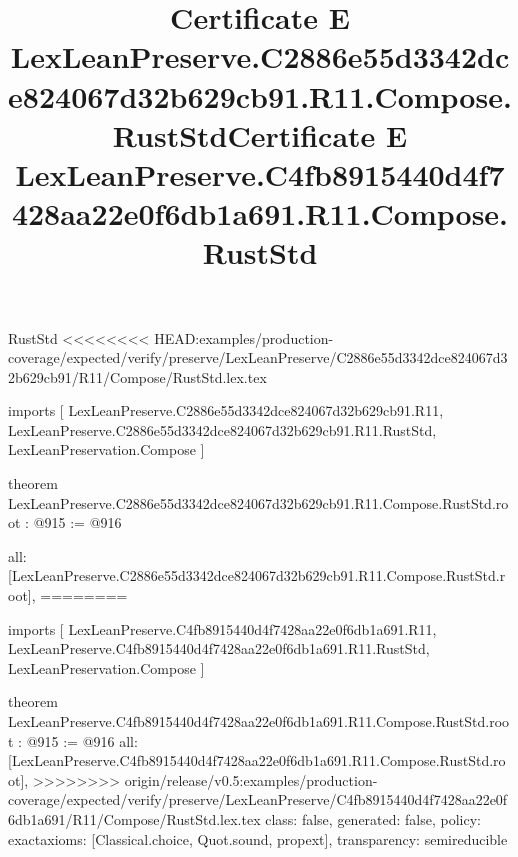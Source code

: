 \begin{lexlean}{RustStd}
<<<<<<<< HEAD:examples/production-coverage/expected/verify/preserve/LexLeanPreserve/C2886e55d3342dce824067d32b629cb91/R11/Compose/RustStd.lex.tex
\title{Certificate E LexLeanPreserve.C2886e55d3342dce824067d32b629cb91.R11.Compose.RustStd}
\begin{coremodule}
imports [
  LexLeanPreserve.C2886e55d3342dce824067d32b629cb91.R11,
  LexLeanPreserve.C2886e55d3342dce824067d32b629cb91.R11.RustStd,
  LexLeanPreservation.Compose
]

theorem LexLeanPreserve.C2886e55d3342dce824067d32b629cb91.R11.Compose.RustStd.root : @915 := @916 {
  all: [LexLeanPreserve.C2886e55d3342dce824067d32b629cb91.R11.Compose.RustStd.root],
========
\title{Certificate E LexLeanPreserve.C4fb8915440d4f7428aa22e0f6db1a691.R11.Compose.RustStd}
\begin{coremodule}
imports [
  LexLeanPreserve.C4fb8915440d4f7428aa22e0f6db1a691.R11,
  LexLeanPreserve.C4fb8915440d4f7428aa22e0f6db1a691.R11.RustStd,
  LexLeanPreservation.Compose
]

theorem LexLeanPreserve.C4fb8915440d4f7428aa22e0f6db1a691.R11.Compose.RustStd.root : @915 := @916 {
  all: [LexLeanPreserve.C4fb8915440d4f7428aa22e0f6db1a691.R11.Compose.RustStd.root],
>>>>>>>> origin/release/v0.5:examples/production-coverage/expected/verify/preserve/LexLeanPreserve/C4fb8915440d4f7428aa22e0f6db1a691/R11/Compose/RustStd.lex.tex
  class: false,
  generated: false,
  policy: exact{axioms: [Classical.choice, Quot.sound, propext]},
  transparency: semireducible
}


\end{coremodule}}
\end{coremodule}
\end{lexlean}
